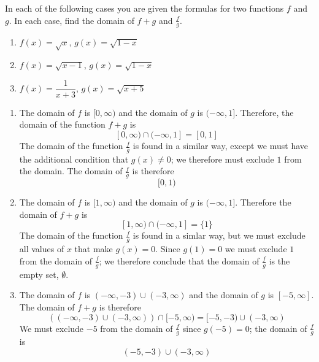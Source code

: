 \begin{pccexample}
In each of the following cases you are given the formulas for two 
functions $f$ and $g$. In each case, find the domain of $f+g$
and $\frac{f}{g}$.
\begin{enumerate}
	\item $f(x)=\sqrt{x}$, $g(x)=\sqrt{1-x}$
	\item $f(x)=\sqrt{x-1}$, $g(x)=\sqrt{1-x}$
	\item $f(x)=\dfrac{1}{x+3}$, $g(x)=\sqrt{x+5}$
\end{enumerate}
\begin{pccsolution}
\begin{enumerate}
	\item The domain of $f$ is $[0,\infty)$ and the domain of $g$ is 
	$(-\infty,1]$.  Therefore, the domain of the function $f+g$ is
	\[
		[0,\infty)\cap (-\infty,1]=[0,1]
	\]
	The domain of the function $\frac{f}{g}$ is found in a similar 
	way, except we must have the additional condition that $g(x)\ne 0$;
	we therefore must exclude $1$ from the domain. The domain 
	of $\frac{f}{g}$ is therefore
	\[
		[0,1)
	\]
	\item The domain of $f$ is $[1,\infty)$ and the domain of $g$ is
	$(-\infty,1]$. Therefore the domain of $f+g$ is 
	\[
		[1,\infty)\cap (-\infty,1]= \{ 1\}
	\]
	The domain of the function $\frac{f}{g}$ is found in a simlar way, but
	we must exclude all values of $x$ that make $g(x)=0$. Since $g(1)=0$
	we must exclude $1$ from the domain of $\frac{f}{g}$; we therefore 
	conclude that the domain of $\frac{f}{g}$ is the empty set, $\emptyset$.
	\item The domain of $f$ is $(-\infty,-3)\cup (-3,\infty)$ and the 
	domain of $g$ is $[-5,\infty]$. The domain of $f+g$ is therefore
	\[
		((-\infty,-3)\cup (-3,\infty))\cap [-5,\infty ) = [-5,-3)\cup (-3,\infty)
	\]
	We must exclude $-5$ from the domain of $\frac{f}{g}$ since $g(-5)=0$; 
	the domain of $\frac{f}{g}$ is
	\[
		(-5,-3)\cup (-3,\infty)
	\]
\end{enumerate}
\end{pccsolution}
\end{pccexample}

